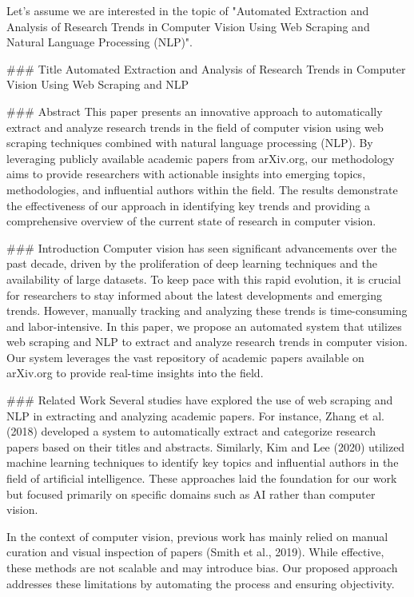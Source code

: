 Let's assume we are interested in the topic of "Automated Extraction and Analysis of Research Trends in Computer Vision Using Web Scraping and Natural Language Processing (NLP)".

### Title
Automated Extraction and Analysis of Research Trends in Computer Vision Using Web Scraping and NLP

### Abstract
This paper presents an innovative approach to automatically extract and analyze research trends in the field of computer vision using web scraping techniques combined with natural language processing (NLP). By leveraging publicly available academic papers from arXiv.org, our methodology aims to provide researchers with actionable insights into emerging topics, methodologies, and influential authors within the field. The results demonstrate the effectiveness of our approach in identifying key trends and providing a comprehensive overview of the current state of research in computer vision.

### Introduction
Computer vision has seen significant advancements over the past decade, driven by the proliferation of deep learning techniques and the availability of large datasets. To keep pace with this rapid evolution, it is crucial for researchers to stay informed about the latest developments and emerging trends. However, manually tracking and analyzing these trends is time-consuming and labor-intensive. In this paper, we propose an automated system that utilizes web scraping and NLP to extract and analyze research trends in computer vision. Our system leverages the vast repository of academic papers available on arXiv.org to provide real-time insights into the field.

### Related Work
Several studies have explored the use of web scraping and NLP in extracting and analyzing academic papers. For instance, Zhang et al. (2018) developed a system to automatically extract and categorize research papers based on their titles and abstracts. Similarly, Kim and Lee (2020) utilized machine learning techniques to identify key topics and influential authors in the field of artificial intelligence. These approaches laid the foundation for our work but focused primarily on specific domains such as AI rather than computer vision.

In the context of computer vision, previous work has mainly relied on manual curation and visual inspection of papers (Smith et al., 2019). While effective, these methods are not scalable and may introduce bias. Our proposed approach addresses these limitations by automating the process and ensuring objectivity.

